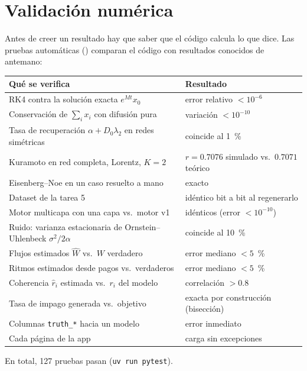 \chapter{Validación numérica}

Antes de creer un resultado hay que saber que el código calcula lo que dice. Las
pruebas automáticas () comparan el código con resultados conocidos de
antemano:

\begin{longtable}{p{}p{}}
\toprule
\textbf{Qué se verifica} & \textbf{Resultado} \\
\midrule
\endhead
RK4 contra la solución exacta $e^{Mt}x_0$ & error relativo $<10^{-6}$ \\
Conservación de $\sum_i x_i$ con difusión pura & variación $<10^{-10}$ \\
Tasa de recuperación $\alpha+D_0\lambda_2$ en redes simétricas & coincide al 1~\% \\
Kuramoto en red completa, Lorentz, $K=2$ & $r=0.7076$ simulado vs.\ $0.7071$ teórico \\
Eisenberg–Noe en un caso resuelto a mano & exacto \\
Dataset de la tarea 5 & idéntico bit a bit al regenerarlo \\
Motor multicapa con una capa vs.\ motor v1 & idénticos (error $<10^{-10}$) \\
Ruido: varianza estacionaria de Ornstein–Uhlenbeck $\sigma^2/2\alpha$ & coincide al 10~\% \\
Flujos estimados $\hat W$ vs.\ $W$ verdadero & error mediano $<5$~\% \\
Ritmos estimados desde pagos vs.\ verdaderos & error mediano $<5$~\% \\
Coherencia $\hat r_i$ estimada vs.\ $r_i$ del modelo & correlación $>0.8$ \\
Tasa de impago generada vs.\ objetivo & exacta por construcción (bisección) \\
Columnas \texttt{truth\_*} hacia un modelo & error inmediato \\
Cada página de la app & carga sin excepciones \\
\bottomrule
\end{longtable}

En total, 127 pruebas pasan (\texttt{uv run pytest}).

